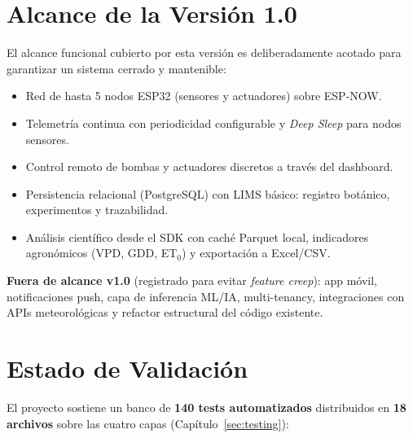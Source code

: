 \section*{Alcance de la Versión 1.0}

El alcance funcional cubierto por esta versión es deliberadamente acotado para
garantizar un sistema cerrado y mantenible:

\begin{itemize}[leftmargin=*, label=--]
    \item Red de hasta 5 nodos ESP32 (sensores y actuadores) sobre ESP-NOW.
    \item Telemetría continua con periodicidad configurable y \textit{Deep Sleep} para nodos sensores.
    \item Control remoto de bombas y actuadores discretos a través del dashboard.
    \item Persistencia relacional (PostgreSQL) con LIMS básico: registro botánico, experimentos y trazabilidad.
    \item Análisis científico desde el SDK con caché Parquet local, indicadores agronómicos (VPD, GDD, ET$_0$) y exportación a Excel/CSV.
\end{itemize}

\textbf{Fuera de alcance v1.0} (registrado para evitar \textit{feature creep}): app
móvil, notificaciones push, capa de inferencia ML/IA, multi-tenancy, integraciones
con APIs meteorológicas y refactor estructural del código existente.

\section*{Estado de Validación}

El proyecto sostiene un banco de \textbf{140 tests automatizados} distribuidos en
\textbf{18 archivos} sobre las cuatro capas (Capítulo~\ref{sec:testing}):

